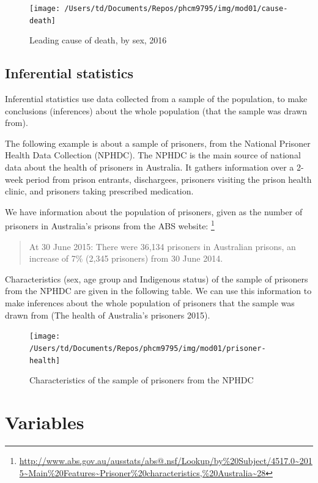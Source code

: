 \documentclass[
]{memoir}
\begin{document}
\begin{figure}
\texttt{[image: /Users/td/Documents/Repos/phcm9795/img/mod01/cause-death]} \caption{Leading cause of death, by sex, 2016}\label{fig:fig1-1}
\end{figure}

\hypertarget{inferential-statistics}{%
\subsection{Inferential statistics}\label{inferential-statistics}}

Inferential statistics use data collected from a sample of the population, to make conclusions (inferences) about the whole population (that the sample was drawn from).

The following example is about a sample of prisoners, from the National Prisoner Health Data Collection (NPHDC). The NPHDC is the main source of national data about the health of prisoners in Australia. It gathers information over a 2-week period from prison entrants, dischargees, prisoners visiting the prison health clinic, and prisoners taking prescribed medication.

We have information about the population of prisoners, given as the number of prisoners in Australia's prisons from the ABS website: \footnote{\url{http://www.abs.gov.au/ausstats/abs@.nsf/Lookup/by\%20Subject/4517.0~2015~Main\%20Features~Prisoner\%20characteristics,\%20Australia~28}}

\begin{quote}
At 30 June 2015: There were 36,134 prisoners in Australian prisons, an increase of 7\% (2,345 prisoners) from 30 June 2014.
\end{quote}

Characteristics (sex, age group and Indigenous status) of the sample of prisoners from the NPHDC are given in the following table. We can use this information to make inferences about the whole population of prisoners that the sample was drawn from (The health of Australia's prisoners 2015).

\begin{figure}
\texttt{[image: /Users/td/Documents/Repos/phcm9795/img/mod01/prisoner-health]} \caption{Characteristics of the sample of prisoners from the NPHDC}\label{fig:fig1-2}
\end{figure}

\hypertarget{variables}{%
\section{Variables}\label{variables}}
\end{document}
